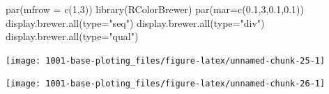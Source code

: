 \documentclass[
]{book}
\newenvironment{Shaded}{\begin{snugshade}}{\end{snugshade}}
\newcommand{\AttributeTok}[1]{\textcolor[rgb]{0.77,0.63,0.00}{#1}}
\newcommand{\CommentTok}[1]{\textcolor[rgb]{0.56,0.35,0.01}{\textit{#1}}}
\newcommand{\DecValTok}[1]{\textcolor[rgb]{0.00,0.00,0.81}{#1}}
\newcommand{\FloatTok}[1]{\textcolor[rgb]{0.00,0.00,0.81}{#1}}
\newcommand{\FunctionTok}[1]{\textcolor[rgb]{0.00,0.00,0.00}{#1}}
\newcommand{\NormalTok}[1]{#1}
\newcommand{\OtherTok}[1]{\textcolor[rgb]{0.56,0.35,0.01}{#1}}
\newcommand{\SpecialCharTok}[1]{\textcolor[rgb]{0.00,0.00,0.00}{#1}}
\newcommand{\StringTok}[1]{\textcolor[rgb]{0.31,0.60,0.02}{#1}}
\begin{document}
\begin{Shaded}
\begin{Highlighting}[]
\FunctionTok{par}\NormalTok{(}\AttributeTok{mfrow =} \FunctionTok{c}\NormalTok{(}\DecValTok{1}\NormalTok{,}\DecValTok{3}\NormalTok{))}
\FunctionTok{library}\NormalTok{(RColorBrewer)}
\FunctionTok{par}\NormalTok{(}\AttributeTok{mar=}\FunctionTok{c}\NormalTok{(}\FloatTok{0.1}\NormalTok{,}\DecValTok{3}\NormalTok{,}\FloatTok{0.1}\NormalTok{,}\FloatTok{0.1}\NormalTok{))}
\FunctionTok{display.brewer.all}\NormalTok{(}\AttributeTok{type=}\StringTok{"seq"}\NormalTok{)}
\FunctionTok{display.brewer.all}\NormalTok{(}\AttributeTok{type=}\StringTok{"div"}\NormalTok{)}
\FunctionTok{display.brewer.all}\NormalTok{(}\AttributeTok{type=}\StringTok{"qual"}\NormalTok{)}
\end{Highlighting}
\end{Shaded}

\begin{center}\texttt{[image: 1001-base-ploting\_files/figure-latex/unnamed-chunk-25-1]} \end{center}

\begin{Shaded}
\end{Shaded}

\begin{center}\texttt{[image: 1001-base-ploting\_files/figure-latex/unnamed-chunk-26-1]} \end{center}

\begin{Shaded}
\end{Shaded}
\end{document}
